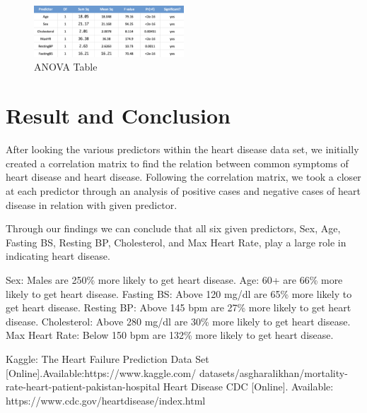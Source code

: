 \documentclass{article}
\begin{document}
\begin{figure}[h]
	\centering
	\includegraphics[width=0.5\textwidth]{images/anova.PNG}
	\caption{ANOVA Table}
	\label{fig9}
\end{figure}


\section{Result and Conclusion}
After looking the various predictors within the heart disease data set, we initially created a correlation matrix to find the relation between common symptoms of heart disease and heart disease. Following the correlation matrix, we took a closer at each predictor through an analysis of positive cases and negative cases of heart disease in relation with given predictor. 

Through our findings we can conclude that all six given predictors, Sex, Age, Fasting BS, Resting BP, Cholesterol, and Max Heart Rate, play a large role in indicating heart disease.

Sex: Males are 250\% more likely to get heart disease.
Age: 60+ are 66\% more likely to get heart disease.
Fasting BS: Above 120 mg/dl are 65\% more likely to get heart disease.
Resting BP: Above 145 bpm are 27\% more likely to get heart disease.
Cholesterol: Above 280 mg/dl are 30\% more likely to get heart disease.
Max Heart Rate: Below 150 bpm are 132\% more likely to get heart disease.


\begin{thebibliography}{1.7} 
	 \color{black}
    Kaggle: The Heart Failure Prediction Data Set [Online].Available:https://www.kaggle.com/
    datasets/asgharalikhan/mortality-rate-heart-patient-pakistan-hospital \color{black}
	 \color{black}Heart Disease CDC [Online]. Available: https://www.cdc.gov/heartdisease/index.html \color{black}
\end{thebibliography}
\end{document}
